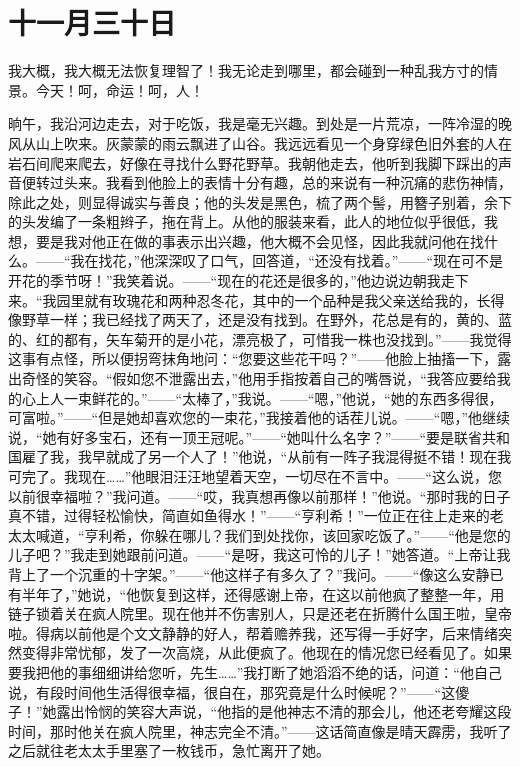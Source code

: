 \documentclass[12pt,oneside]{book}
\begin{document}
\chapter{十一月三十日}
我大概，我大概无法恢复理智了！我无论走到哪里，都会碰到一种乱我方寸的情景。今天！呵，命运！呵，人！

晌午，我沿河边走去，对于吃饭，我是毫无兴趣。到处是一片荒凉，一阵冷湿的晚风从山上吹来。灰蒙蒙的雨云飘进了山谷。我远远看见一个身穿绿色旧外套的人在岩石间爬来爬去，好像在寻找什么野花野草。我朝他走去，他听到我脚下踩出的声音便转过头来。我看到他脸上的表情十分有趣，总的来说有一种沉痛的悲伤神情，除此之处，则显得诚实与善良；他的头发是黑色，梳了两个髻，用簪子别着，余下的头发编了一条粗辫子，拖在背上。从他的服装来看，此人的地位似乎很低，我想，要是我对他正在做的事表示出兴趣，他大概不会见怪，因此我就问他在找什么。——“我在找花，”他深深叹了口气，回答道，“还没有找着。”——“现在可不是开花的季节呀！”我笑着说。——“现在的花还是很多的，”他边说边朝我走下来。“我园里就有玫瑰花和两种忍冬花，其中的一个品种是我父亲送给我的，长得像野草一样；我已经找了两天了，还是没有找到。在野外，花总是有的，黄的、蓝的、红的都有，矢车菊开的是小花，漂亮极了，可惜我一株也没找到。”——我觉得这事有点怪，所以便拐弯抹角地问：“您要这些花干吗？”——他脸上抽搐一下，露出奇怪的笑容。“假如您不泄露出去，”他用手指按着自己的嘴唇说，“我答应要给我的心上人一束鲜花的。”——“太棒了，”我说。——“嗯，”他说，“她的东西多得很，可富啦。”——“但是她却喜欢您的一束花，”我接着他的话茬儿说。——“嗯，”他继续说，“她有好多宝石，还有一顶王冠呢。”——“她叫什么名字？”——“要是联省共和国雇了我，我早就成了另一个人了！”他说，“从前有一阵子我混得挺不错！现在我可完了。我现在……”他眼泪汪汪地望着天空，一切尽在不言中。——“这么说，您以前很幸福啦？”我问道。——“哎，我真想再像以前那样！”他说。“那时我的日子真不错，过得轻松愉快，简直如鱼得水！”——“亨利希！”一位正在往上走来的老太太喊道，“亨利希，你躲在哪儿？我们到处找你，该回家吃饭了。”——“他是您的儿子吧？”我走到她跟前问道。——“是呀，我这可怜的儿子！”她答道。“上帝让我背上了一个沉重的十字架。”——“他这样子有多久了？”我问。——“像这么安静已有半年了，”她说，“他恢复到这样，还得感谢上帝，在这以前他疯了整整一年，用链子锁着关在疯人院里。现在他并不伤害别人，只是还老在折腾什么国王啦，皇帝啦。得病以前他是个文文静静的好人，帮着赡养我，还写得一手好字，后来情绪突然变得非常忧郁，发了一次高烧，从此便疯了。他现在的情况您已经看见了。如果要我把他的事细细讲给您听，先生……”我打断了她滔滔不绝的话，问道：“他自己说，有段时间他生活得很幸福，很自在，那究竟是什么时候呢？”——“这傻子！”她露出怜悯的笑容大声说，“他指的是他神志不清的那会儿，他还老夸耀这段时间，那时他关在疯人院里，神志完全不清。”——这话简直像是晴天霹雳，我听了之后就往老太太手里塞了一枚钱币，急忙离开了她。
\end{document}
